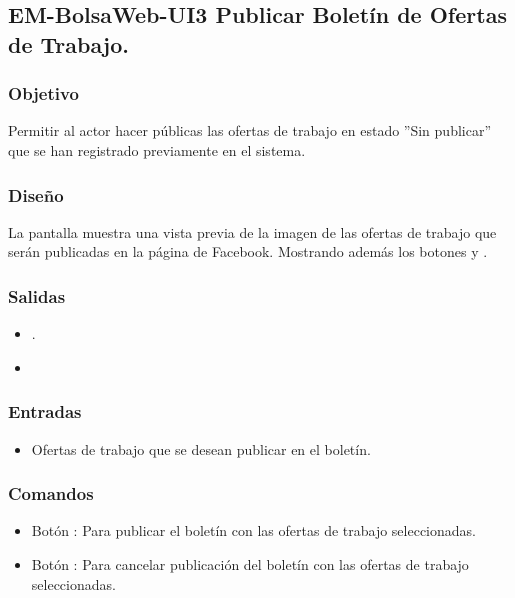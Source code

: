 
\subsection{EM-BolsaWeb-UI3 Publicar Boletín de Ofertas de Trabajo.}

\subsubsection{Objetivo}
	\noindent
	Permitir al actor hacer públicas las ofertas de trabajo en estado ''Sin publicar'' que se han registrado previamente en el sistema. 

\subsubsection{Diseño}
	\noindent
	La pantalla muestra una vista previa de la imagen de las ofertas de trabajo que serán publicadas en la página de Facebook.
	Mostrando además los botones  y .

\pagebreak
{}

\subsubsection{Salidas}
	\begin{itemize}
		\item {}.
		\item {}
	\end{itemize}

\subsubsection{Entradas}
	\begin{itemize}
		\item Ofertas de trabajo que se desean publicar en el boletín.
	\end{itemize}

\subsubsection{Comandos}
 	\begin{itemize}
		\item Botón : Para publicar el boletín con las ofertas de trabajo seleccionadas.
		\item Botón : Para cancelar publicación del boletín con las ofertas de trabajo seleccionadas.
	\end{itemize}









